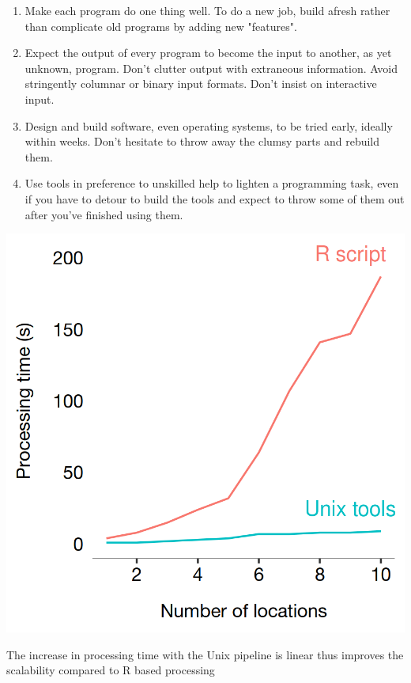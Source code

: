 \begin{enumerate}
  \setlength{\itemindent}{2em}
  \itemsep-0.25em
	\item Make each program do one thing well. To do a new job, build afresh rather than complicate old programs by adding new "features".
	\item Expect the output of every program to become the input to another, as yet unknown, program. Don't clutter output with extraneous information. Avoid stringently columnar or binary input formats. Don't insist on interactive input.
	\item Design and build software, even operating systems, to be tried early, ideally within weeks. Don't hesitate to throw away the clumsy parts and rebuild them.
	\item Use tools in preference to unskilled help to lighten a programming task, even if you have to detour to build the tools and expect to throw some of them out after you've finished using them.
\end{enumerate}

\begin{marginfigure}[5cm]
  \includegraphics[trim={0 0 0 0},clip]{images/processing-times-r.png}
  \caption{The increase in processing time with the Unix pipeline is linear thus improves the scalability compared to R based processing}
  \label{figure:toolkit:time:new}
\end{marginfigure}

